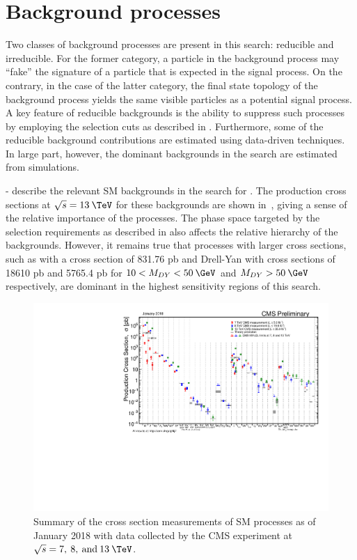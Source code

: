 \chapter{Background processes}
\label{chap:backgrounds}

Two classes of background processes are present in this search: reducible and irreducible. For the former category, a particle in the background process may ``fake'' the signature of a particle that is expected in the signal process. On the contrary, in the case of the latter category, the final state topology of the background process yields the same visible particles as a potential signal process. A key feature of reducible backgrounds is the ability to suppress such processes by employing the selection cuts as described in . Furthermore, some of the reducible background contributions are estimated using data-driven techniques. In large part, however, the dominant backgrounds in the search are estimated from simulations.

- describe the relevant SM backgrounds in the search for \ttllDM. The production cross sections at $\sqrt{s}=13\:\TeV$ for these backgrounds are shown in~, giving a sense of the relative importance of the processes. The phase space targeted by the selection requirements as described in  also affects the relative hierarchy of the backgrounds. However, it remains true that processes with larger cross sections, such as \ttbar with a cross section of 831.76 pb and Drell-Yan with cross sections of 18610 pb and 5765.4 pb for $10<M_{DY}<50\:\GeV$ and $M_{DY}>50\:\GeV$ respectively, are dominant in the highest sensitivity regions of this search.

\begin{figure}
  \begin{center}
    \includegraphics[width=\textwidth]{figs/SigmaNew_v0.pdf}
    \caption{Summary of the cross section measurements of SM processes as of January 2018 with data collected by the CMS experiment at $\sqrt{s}=7,\:8,\:\text{and}\: 13\:\TeV$. }
    \label{fig:SMxsec}
  \end{center}
\end{figure}


